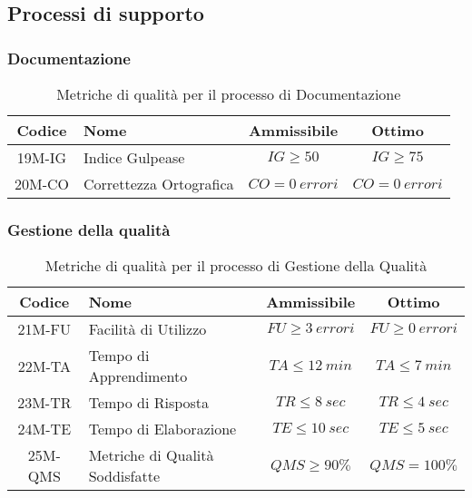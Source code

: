 \newpage
\subsection{Processi di supporto}
\subsubsection{Documentazione}
\begin{table}[h!]
	\centering
	\begin{tabular}{ | c | l | c | c | }
		\hline
		Codice   & Nome                    & Ammissibile        & Ottimo             \\
		\hline
		19M-IG   & Indice Gulpease         & $IG \geq 50$       & $IG \geq 75$       \\
		20M-CO   & Correttezza Ortografica & $CO = 0\ errori$   & $CO = 0\ errori$   \\
		\hline
	\end{tabular}
	\caption{Metriche di qualità per il processo di Documentazione}
\end{table}

\subsubsection{Gestione della qualità}
\begin{table}[h!]
	\centering
	\begin{tabular}{ | c | l | c | c | }
		\hline
		Codice   & Nome                           & Ammissibile         & Ottimo              \\
		\hline
		21M-FU  & Facilità di Utilizzo            & $FU \geq 3\ errori$ & $FU \geq 0\ errori$ \\
		22M-TA  & Tempo di Apprendimento	      & $TA \leq 12\ min$   & $TA \leq 7\ min$    \\
		23M-TR  & Tempo di Risposta		          & $TR \leq 8\ sec$    & $TR \leq 4\ sec$    \\
		24M-TE  & Tempo di Elaborazione		      & $TE \leq 10\ sec$   & $TE \leq 5\ sec$    \\
		25M-QMS & Metriche di Qualità Soddisfatte & $QMS \geq 90\%$     & $QMS = 100\%$       \\
		\hline
	\end{tabular}
	\caption{Metriche di qualità per il processo di Gestione della Qualità}
\end{table}

